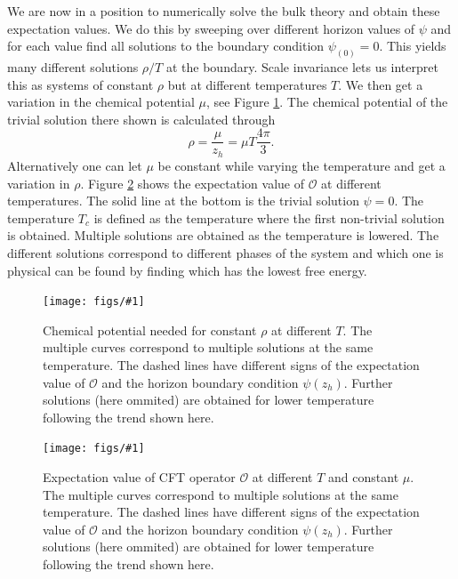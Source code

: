 \documentclass[12pt]{report}
\newcommand{\fig}[2]{
\begin{figure}
\centering
\texttt{[image: figs/\#1]}
\caption{#2}
\end{figure}
}
\begin{document}
We are now in a position to numerically solve the bulk theory and obtain these expectation values. We do this by sweeping over different horizon values of $\psi$ and for each value find all solutions to the boundary condition $\psi_{(0)}=0$. This yields many different solutions $\rho/T$ at the boundary. Scale invariance lets us interpret this as systems of constant $\rho$ but at different temperatures $T$. We then get a variation in the chemical potential $\mu$, see Figure \ref{f:mu}. The chemical potential of the trivial solution there shown is calculated through
\begin{equation}
 \rho=\frac{\mu}{z_h}=\mu T\frac{4\pi}{3}.\label{muTdep}
\end{equation}
Alternatively one can let $\mu$ be constant while varying the temperature and get a variation in $\rho$. Figure \ref{f:O} shows the expectation value of $\mathcal{O}$ at different temperatures. The solid line at the bottom is the trivial solution $\psi=0$. The temperature $T_c$ is defined as the temperature where the first non-trivial solution is obtained. Multiple solutions are obtained as the temperature is lowered. The different solutions correspond to different phases of the system and which one is physical can be found by finding which has the lowest free energy.

\fig{mu_constRho_a2_0.0.pdf}{
Chemical potential needed for constant $\rho$ at different $T$. The multiple curves correspond to multiple solutions at the same temperature. The dashed lines have different signs of the expectation value of $\mathcal{O}$ and the horizon boundary condition $\psi(z_h)$. Further solutions (here ommited) are obtained for lower temperature following the trend shown here.\label{f:mu}
}

\fig{O_constRho_a2_0.0.pdf}{Expectation value of CFT operator $\mathcal{O}$ at different $T$ and constant $\mu$. The multiple curves correspond to multiple solutions at the same temperature. The dashed lines have different signs of the expectation value of $\mathcal{O}$ and the horizon boundary condition $\psi(z_h)$. Further solutions (here ommited) are obtained for lower temperature following the trend shown here.\label{f:O}}
\end{document}
